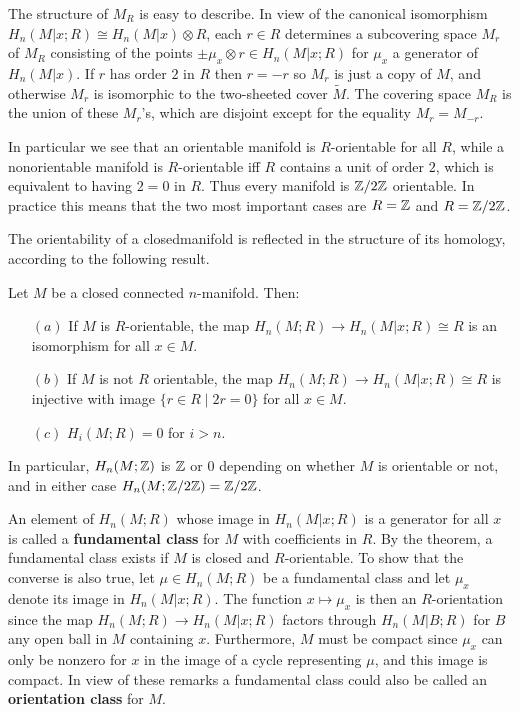 The structure of $M_R$ is easy to describe. In view of the canonical isomorphism $H_n(M|x;R)\cong H_n(M|x)\otimes R$, each $r\in R$ determines a subcovering space $M_r$ of $M_R$ consisting of the points $\pm\mu_x\otimes r\in H_n(M|x;R)$ for $\mu_x$ a generator of $H_n(M|x)$. If $r$ has order $2$ in $R$ then $r=-r$ so $M_r$ is just a copy of $M$, and otherwise $M_r$ is
isomorphic to the two-sheeted cover $\widetilde{M}$. The covering space $M_R$ is the union of these $M_r$'s, which are disjoint except for the equality $M_r=M_{-r}$.\par
In particular we see that an orientable manifold is $R$-orientable for all $R$, while a nonorientable manifold is $R$-orientable iff $R$ contains a unit of order $2$, which is equivalent to having $2=0$ in $R$. Thus every manifold is $\mathbb{Z}/2\mathbb{Z}$ orientable. In practice this means that the two most important cases are $R=\mathbb{Z}$ and $R=\mathbb{Z}/2\mathbb{Z}$.\par
The orientability of a closedmanifold is reflected in the structure of its homology, according to the following result.
\begin{theorem}\label{homology orientability}
Let $M$ be a closed connected $n$-manifold. Then:
\begin{itemize}
\item[$(a)$]If $M$ is $R$-orientable, the map $H_n(M;R)\to H_n(M|x;R)\cong R$ is an isomorphism for all $x\in M$.
\item[$(b)$]If $M$ is not $R$ orientable, the map $H_n(M;R)\to H_n(M|x;R)\cong R$ is injective with image $\{r\in R\mid 2r=0\}$ for all $x\in M$.
\item[$(c)$]$H_i(M;R)=0$ for $i>n$.
\end{itemize}
\end{theorem}
In particular, $H_n(M;\mathbb{Z})$ is $\mathbb{Z}$ or $0$ depending on whether $M$ is orientable or not, and in either case $H_n(M;\mathbb{Z}/2\mathbb{Z})=\mathbb{Z}/2\mathbb{Z}$.\par 
An element of $H_n(M;R)$ whose image in $H_n(M|x;R)$ is a generator for all $x$ is called a \textbf{fundamental class} for $M$ with coefficients in $R$. By the theorem, a fundamental class exists if $M$ is closed and $R$-orientable. To show that the converse is also true, let $\mu\in H_n(M;R)$ be a fundamental class and let $\mu_x$ denote its image in $H_n(M|x;R)$. The function $x\mapsto\mu_x$ is then an $R$-orientation since the map $H_n(M;R)\to H_n(M|x;R)$ factors through $H_n(M|B;R)$ for $B$ any open ball in $M$ containing $x$. Furthermore, $M$ must be compact since $\mu_x$ can only be nonzero for $x$ in the image of a cycle representing $\mu$, and this image is compact. In view of these remarks a fundamental class could also be called an \textbf{orientation class} for $M$.\par
